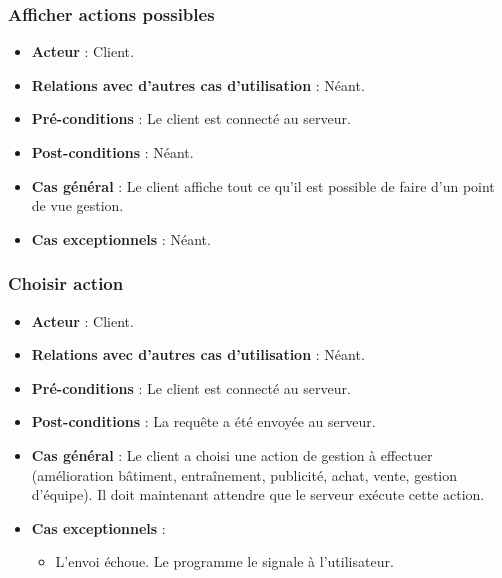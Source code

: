 \documentclass[a4paper,titlepage]{scrreprt}
\begin{document}
    \subsubsection{Afficher actions possibles}
      \begin{itemize}
        \item \textbf{Acteur}  : Client.
        \item \textbf{Relations avec d'autres cas d'utilisation}  : Néant.
        \item \textbf{Pré-conditions} : Le client est connecté au serveur.
        \item \textbf{Post-conditions} : Néant.
        \item \textbf{Cas général} : Le client affiche tout ce qu’il est possible de faire d’un point de vue gestion.
        \item \textbf{Cas exceptionnels} : Néant.
      \end{itemize}
    \subsubsection{Choisir action}
      \begin{itemize}
        \item \textbf{Acteur}  : Client.
        \item \textbf{Relations avec d'autres cas d'utilisation}  : Néant.
        \item \textbf{Pré-conditions} : Le client est connecté au serveur.
        \item \textbf{Post-conditions} : La requête a été envoyée au serveur.
        \item \textbf{Cas général} : Le client a choisi une action de gestion à effectuer (amélioration bâtiment, entraînement, publicité, achat, vente, gestion d’équipe). Il doit maintenant attendre que le serveur exécute cette action.
        \item \textbf{Cas exceptionnels} : 
        \begin{itemize}
            \item L'envoi échoue. Le programme le signale à l'utilisateur.
          \end{itemize}
      \end{itemize}
\end{document}
